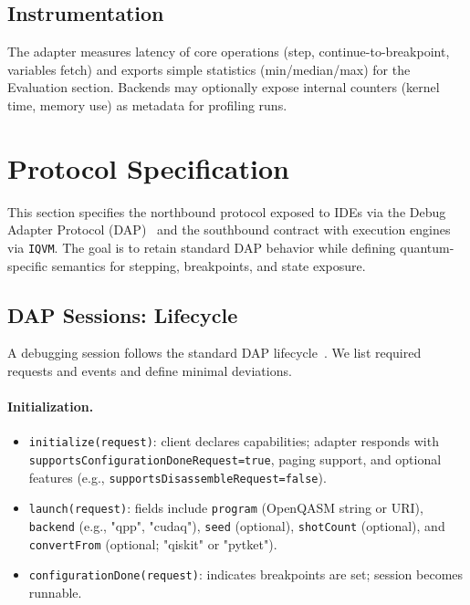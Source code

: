 \documentclass[12pt]{article}
\begin{document}
\subsection{Instrumentation}

The adapter measures latency of core operations (step, continue-to-breakpoint, variables fetch) and exports simple statistics (min/median/max) for the Evaluation section. Backends may optionally expose internal counters (kernel time, memory use) as metadata for profiling runs.



\section{Protocol Specification}
\label{sec:protocol}

This section specifies the northbound protocol exposed to IDEs via the Debug Adapter Protocol (DAP)~\cite{dap} and the southbound contract with execution engines via \texttt{IQVM}. The goal is to retain standard DAP behavior while defining quantum-specific semantics for stepping, breakpoints, and state exposure.

\subsection{DAP Sessions: Lifecycle}

A debugging session follows the standard DAP lifecycle~\cite{dap}. We list required requests and events and define minimal deviations.

\paragraph{Initialization.}
\begin{itemize}
  \item \texttt{initialize(request)}: client declares capabilities; adapter responds with \texttt{supportsConfigurationDoneRequest=true}, paging support, and optional features (e.g., \texttt{supportsDisassembleRequest=false}).
  \item \texttt{launch(request)}: fields include \texttt{program} (OpenQASM string or URI), \texttt{backend} (e.g., "qpp", "cudaq"), \texttt{seed} (optional), \texttt{shotCount} (optional), and \texttt{convertFrom} (optional; "qiskit" or "pytket").
  \item \texttt{configurationDone(request)}: indicates breakpoints are set; session becomes runnable.
\end{itemize}
\end{document}
